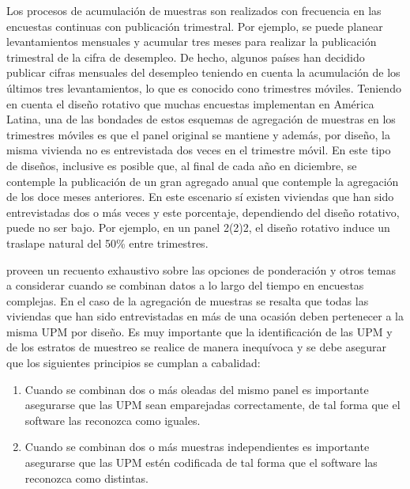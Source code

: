 \documentclass[
  12pt,
]{book}
\providecommand{\tightlist}{%
  \setlength{\itemsep}{0pt}\setlength{\parskip}{0pt}}
\begin{document}
Los procesos de acumulación de muestras son realizados con frecuencia en
las encuestas continuas con publicación trimestral. Por ejemplo, se
puede planear levantamientos mensuales y acumular tres meses para
realizar la publicación trimestral de la cifra de desempleo. De hecho,
algunos países han decidido publicar cifras mensuales del desempleo
teniendo en cuenta la acumulación de los últimos tres levantamientos, lo
que es conocido cono trimestres móviles. Teniendo en cuenta el diseño
rotativo que muchas encuestas implementan en América Latina, una de las
bondades de estos esquemas de agregación de muestras en los trimestres
móviles es que el panel original se mantiene y además, por diseño, la
misma vivienda no es entrevistada dos veces en el trimestre móvil. En
este tipo de diseños, inclusive es posible que, al final de cada año en
diciembre, se contemple la publicación de un gran agregado anual que
contemple la agregación de los doce meses anteriores. En este escenario
sí existen viviendas que han sido entrevistadas dos o más veces y este
porcentaje, dependiendo del diseño rotativo, puede no ser bajo. Por
ejemplo, en un panel 2(2)2, el diseño rotativo induce un traslape
natural del 50\% entre trimestres.

\citet[capítulos 7 y 8]{Korn_Graubard_1999} proveen un recuento exhaustivo
sobre las opciones de ponderación y otros temas a considerar cuando se
combinan datos a lo largo del tiempo en encuestas complejas. En el caso
de la agregación de muestras se resalta que todas las viviendas que han
sido entrevistadas en más de una ocasión deben pertenecer a la misma UPM
por diseño. Es muy importante que la identificación de las UPM y de los
estratos de muestreo se realice de manera inequívoca y se debe
asegurar que los siguientes principios se cumplan a cabalidad:

\begin{enumerate}
\def\labelenumi{\arabic{enumi}.}
\tightlist
\item
  Cuando se combinan dos o más oleadas del mismo panel es importante
  asegurarse que las UPM sean emparejadas correctamente, de tal forma
  que el software las reconozca como iguales.
\item
  Cuando se combinan dos o más muestras independientes es importante
  asegurarse que las UPM estén codificada de tal forma que el software
  las reconozca como distintas.
\end{enumerate}
\end{document}
